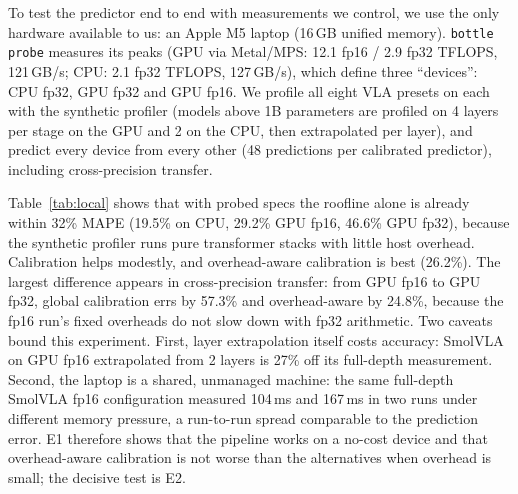 To test the predictor end to end with measurements we control, we use the only hardware available
to us: an Apple M5 laptop (16\,GB unified memory). \texttt{bottle probe} measures its peaks
(GPU via Metal/MPS: 12.1 fp16 / 2.9 fp32 TFLOPS, 121\,GB/s; CPU: 2.1 fp32 TFLOPS, 127\,GB/s),
which define three ``devices'': CPU fp32, GPU fp32 and GPU fp16. We profile all eight VLA presets
on each with the synthetic profiler (models above 1B parameters are profiled on 4 layers per stage
on the GPU and 2 on the CPU, then extrapolated per layer), and predict every device from every
other (48 predictions per calibrated predictor), including cross-precision transfer.

\begin{table}[h]\centering\small

\caption{E1: latency prediction across the three local Apple M5 configurations (8 VLAs).}\label{tab:local}
\end{table}

Table~\ref{tab:local} shows that with probed specs the roofline alone is already within 32\% MAPE
(19.5\% on CPU, 29.2\% GPU fp16, 46.6\% GPU fp32), because the synthetic profiler runs pure
transformer stacks with little host overhead. Calibration helps modestly, and overhead-aware
calibration is best (26.2\%). The largest difference appears in cross-precision transfer: from
GPU fp16 to GPU fp32, global calibration errs by 57.3\% and overhead-aware by 24.8\%, because
the fp16 run's fixed overheads do not slow down with fp32 arithmetic. Two caveats bound this
experiment. First, layer extrapolation itself costs accuracy: SmolVLA on GPU fp16 extrapolated
from 2 layers is 27\% off its full-depth measurement. Second, the laptop is a shared, unmanaged
machine: the same full-depth SmolVLA fp16 configuration measured 104\,ms and 167\,ms in two runs
under different memory pressure, a run-to-run spread comparable to the prediction error.
E1 therefore shows that the pipeline works on a no-cost device and that overhead-aware
calibration is not worse than the alternatives when overhead is small; the decisive test is E2.
